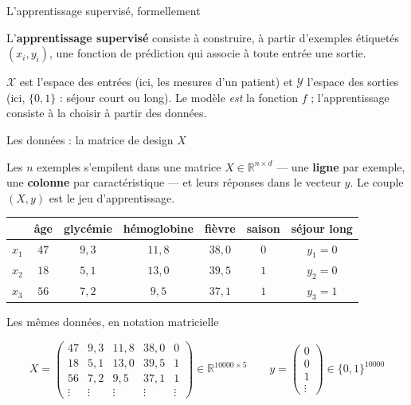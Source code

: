 \documentclass[aspectratio=169,11pt]{beamer}
\begin{document}
\begin{frame}{L'apprentissage supervisé, formellement}
\begin{ucaddef}[Définition]
{\small L'\textbf{apprentissage supervisé} consiste à construire, à partir d'exemples étiquetés $(x_i, y_i)$, une fonction de prédiction qui associe à toute entrée une sortie.}
\end{ucaddef}
{\small $\mathcal{X}$ est l'espace des entrées (ici, les mesures d'un patient) et $\mathcal{Y}$ l'espace des sorties (ici, $\{0,1\}$ : séjour court ou long). Le modèle \emph{est} la fonction $f$ ; l'apprentissage consiste à la choisir à partir des données.}
\end{frame}

\begin{frame}{Les données : la matrice de design $X$}
\begin{ucaddef}
{\small Les $n$ exemples s'empilent dans une matrice $X \in \mathbb{R}^{n\times d}$ — une \textbf{ligne} par exemple, une \textbf{colonne} par caractéristique — et leurs réponses dans le vecteur $y$. Le couple $(X,y)$ est le jeu d'apprentissage.}
\end{ucaddef}
\begin{ucadex}
{\footnotesize \begin{tabular}{c|ccccc|c}
 & âge & glycémie & hémoglobine & fièvre & saison & séjour long\\\hline
$x_1$ & $47$ & $9{,}3$ & $11{,}8$ & $38{,}0$ & $0$ & $y_1 = 0$\\
$x_2$ & $18$ & $5{,}1$ & $13{,}0$ & $39{,}5$ & $1$ & $y_2 = 0$\\
$x_3$ & $56$ & $7{,}2$ & $9{,}5$ & $37{,}1$ & $1$ & $y_3 = 1$\\
\end{tabular}}
\end{ucadex}

\end{frame}

\begin{frame}{Les mêmes données, en notation matricielle}
\begin{ucadex}[$X$ et $y$ de DataSANTÉ-221]
{\footnotesize \[ X=\begin{pmatrix} 47 & 9{,}3 & 11{,}8 & 38{,}0 & 0\\ 18 & 5{,}1 & 13{,}0 & 39{,}5 & 1\\ 56 & 7{,}2 & 9{,}5 & 37{,}1 & 1\\ \vdots & \vdots & \vdots & \vdots & \vdots \end{pmatrix} \in \mathbb{R}^{10000\times 5} \qquad y=\begin{pmatrix} 0\\ 0\\ 1\\ \vdots \end{pmatrix} \in \{0,1\}^{10000} \]}
\end{ucadex}

\end{frame}
\end{document}
